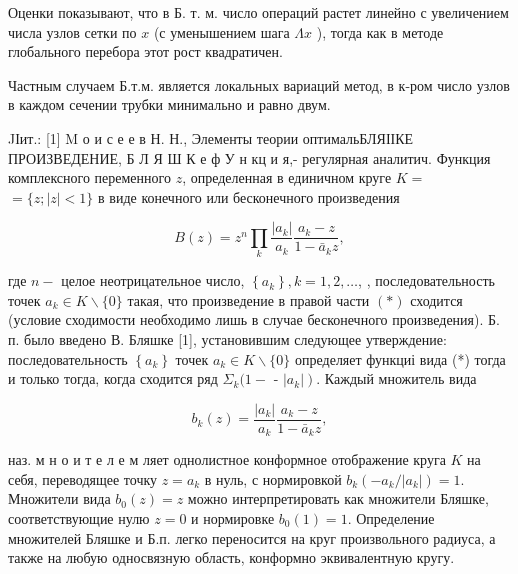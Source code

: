 \documentclass[10pt]{article}
\begin{document}
Оценки показывают, что в Б. т. м. число операций растет линейно с увеличением числа узлов сетки по $x$ (с уменышением шага $\Lambda x$ ), тогда как в методе глобального перебора этот рост квадратичен.



Частным случаем Б.т.м. является локальных вариаций метод, в к-ром число узлов в каждом сечении трубки минимально и равно двум.



JІит.: [1] M о и с е е в Н. Н., Элементы теории оптимальБЛЯІІКЕ ПРОИЗВЕДЕНИЕ, Б Л Я Ш К е ф У н кц и я,- регулярная аналитич. Функция комплексного переменного $z$, определенная в единичном круге $K=$ $=\{z ;|z|<1\}$ в виде конечного или бесконечного произведения



\[

B(z)=z^{n} \prod_{k} \frac{\left|a_{k}\right|}{a_{k}} \frac{a_{k}-z}{1-\bar{a}_{k} z},

\]



где $n-$ целое неотрицательное число, $\left\{a_{k}\right\}, k=1,2, \ldots$, , последовательность точек $a_{k} \in K \backslash\{0\}$ такая, что произведение в правой части $(*)$ сходится (условие сходимости необходимо лишь в случае бесконечного произведения). Б. п. было введено В. Бляшке [1], установившим следующее утверждение: последовательность $\left\{a_{k}\right\}$ точек $a_{k} \in K \backslash\{0\}$ определяет функциі вида (*) тогда и только тогда, когда сходится ряд $\Sigma_{k}(1-$ - $\left.\left|a_{k}\right|\right)$. Каждый множитель вида



\[

b_{k}(z)=\frac{\left|a_{k}\right|}{a_{k}} \frac{a_{k}-z}{1-\bar{a}_{k} z},

\]



наз. м н о и т е л е м ляет однолистное конформное отображение круга $K$ на себя, переводящее точку $z=a_{k}$ в нуль, с нормировкой $b_{k}\left(-a_{k} /\left|a_{k}\right|\right)=1$. Множители вида $b_{0}(z)=z$ можно интерпретировать как множители Бляшке, соответствующие нулю $z=0$ и нормировке $b_{0}(1)=1$. Определение множителей Бляшке и Б.п. легко переносится на круг произвольного радиуса, а также на любую односвязную область, конформно эквивалентную кругу.
\end{document}
